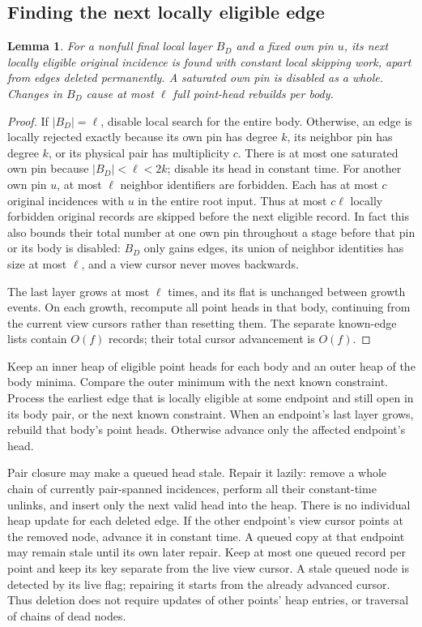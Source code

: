 \documentclass[11pt,a4paper]{article}
\newtheorem{lemma}[theorem]{Lemma}
\theoremstyle{definition}
\theoremstyle{remark}
\begin{document}
\subsection{Finding the next locally eligible edge}

\begin{lemma}\label{lem:successor}
For a nonfull final local layer $B_D$ and a fixed own
pin $u$, its next locally eligible original incidence
is found with constant local skipping work, apart from
edges deleted permanently. A saturated own pin is
disabled as a whole. Changes in $B_D$ cause at most
$\ell$ full point-head rebuilds per body.
\end{lemma}
\begin{proof}
If $|B_D|=\ell$, disable local search for the entire
body. Otherwise, an edge is locally rejected exactly
because its own pin has degree $k$, its neighbor pin
has degree $k$, or its physical pair has multiplicity $c$.
There is at most one saturated own pin because
$|B_D|<\ell<2k$; disable its head in constant time.
For another own pin $u$, at most $\ell$ neighbor
identifiers are forbidden. Each has at most $c$ original
incidences with $u$ in the entire root input.
Thus at most $c\ell$ locally forbidden original records
are skipped before the next eligible record.
In fact this also bounds their total number at one own pin
throughout a stage before that pin or its body is disabled:
$B_D$ only gains edges, its union of neighbor identities has size
at most $\ell$, and a view cursor never moves backwards.

The last layer grows at most $\ell$ times, and its
flat is unchanged between growth events. On each growth,
recompute all point heads in that body, continuing from
the current view cursors rather than resetting them.
The separate known-edge lists contain $O(f)$ records;
their total cursor advancement is $O(f)$.
\end{proof}

Keep an inner heap of eligible point heads for each
body and an outer heap of the body minima. Compare
the outer minimum with the next known constraint.
Process the earliest edge that is locally eligible
at some endpoint and still open in its body pair,
or the next known constraint.
When an endpoint's last layer grows, rebuild that
body's point heads. Otherwise advance only the affected
endpoint's head.

Pair closure may make a queued head stale. Repair it
lazily: remove a whole chain of currently pair-spanned
incidences, perform all their constant-time unlinks,
and insert only the next valid head into the heap.
There is no individual heap update for each deleted
edge. If the other endpoint's view cursor points at
the removed node, advance it in constant time.
A queued copy at that endpoint may remain stale until
its own later repair.
Keep at most one queued record per point and keep its key
separate from the live view cursor. A stale queued node is
detected by its live flag; repairing it starts from the already
advanced cursor. Thus deletion does not require updates of
other points' heap entries, or traversal of chains of dead nodes.
\end{document}
